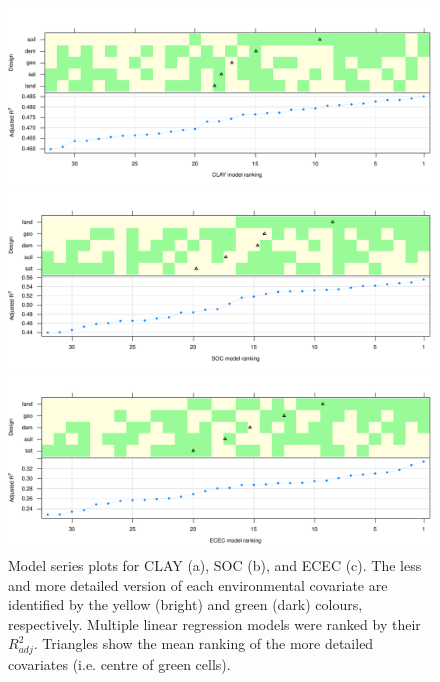 \begin{figure}[!ht]
  \centering
    \begin{minipage}[b]{\textwidth}
      \subcaption{}
      \includegraphics[width=\textwidth]{chap01FIG5a}
    \end{minipage}
    \begin{minipage}[b]{\textwidth}
      \subcaption{}
      \includegraphics[width=\textwidth]{chap01FIG5b}
    \end{minipage}
    \begin{minipage}[b]{\textwidth}
      \subcaption{}
      \includegraphics[width=\textwidth]{chap01FIG5c}
    \end{minipage}
  \caption{Model series plots for CLAY (a), SOC (b), and ECEC (c). The less and 
  more detailed version of each environmental covariate are identified by the 
  yellow (bright) and green (dark) colours, respectively. Multiple linear 
  regression models were ranked by their ${R}^{2}_{adj}$. Triangles show the 
  mean ranking of the more detailed covariates (i.e. centre of green cells).}
  \label{fig:model-series}
\end{figure}

